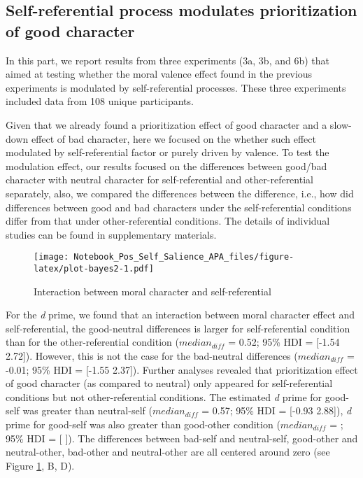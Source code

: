 \documentclass[
  man]{apa6}
\begin{document}
\hypertarget{self-referential-process-modulates-prioritization-of-good-character}{%
\subsection{Self-referential process modulates prioritization of good character}\label{self-referential-process-modulates-prioritization-of-good-character}}

In this part, we report results from three experiments (3a, 3b, and 6b) that aimed at testing whether the moral valence effect found in the previous experiments is modulated by self-referential processes. These three experiments included data from 108 unique participants.

Given that we already found a prioritization effect of good character and a slow-down effect of bad character, here we focused on the whether such effect modulated by self-referential factor or purely driven by valence. To test the modulation effect, our results focused on the differences between good/bad character with neutral character for self-referential and other-referential separately, also, we compared the differences between the difference, i.e., how did differences between good and bad characters under the self-referential conditions differ from that under other-referential conditions. The details of individual studies can be found in supplementary materials.

\begin{figure}
\centering
\texttt{[image: Notebook\_Pos\_Self\_Salience\_APA\_files/figure-latex/plot-bayes2-1.pdf]}
\caption{\label{fig:plot-bayes2}Interaction between moral character and self-referential}
\end{figure}

For the \emph{d} prime, we found that an interaction between moral character effect and self-referential, the good-neutral differences is larger for self-referential condition than for the other-referential condition (\(median_{diff}\) = 0.52; 95\% HDI = {[}-1.54 2.72{]}). However, this is not the case for the bad-neutral differences (\(median_{diff}\) = -0.01; 95\% HDI = {[}-1.55 2.37{]}). Further analyses revealed that prioritization effect of good character (as compared to neutral) only appeared for self-referential conditions but not other-referential conditions. The estimated \emph{d} prime for good-self was greater than neutral-self (\(median_{diff}\) = 0.57; 95\% HDI = {[}-0.93 2.88{]}), \emph{d} prime for good-self was also greater than good-other condition (\(median_{diff}\) = ; 95\% HDI = {[} {]}). The differences between bad-self and neutral-self, good-other and neutral-other, bad-other and neutral-other are all centered around zero (see Figure \ref{fig:plot-bayes2}, B, D).
\end{document}
